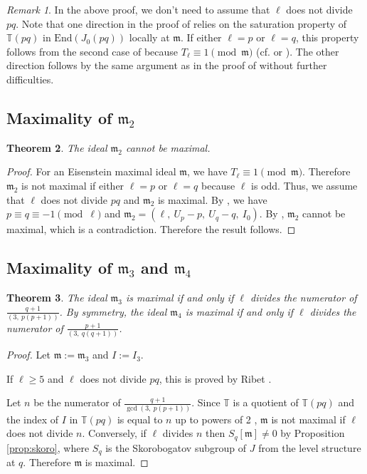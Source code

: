 \documentclass[a4paper, 12pt]{amsart}
\newtheorem{thm}{Theorem}[section]
\theoremstyle{definition}
\theoremstyle{remark}
\newtheorem{rem}[thm]{Remark}
\numberwithin{equation}{section} \numberwithin{table}{section}
\begin{document}
\begin{rem}
In the above proof, we don't need to assume that $\ell$ does not divide $pq$. Note that one direction in the proof of \cite[Theorem 2.4]{Yoo14a} relies on the saturation property of ${{\mathbb{T}}}(pq)$ in ${{\mathrm{End}}}(J_0(pq))$ locally at ${{\mathfrak{m}}}$. If either $\ell=p$ or $\ell=q$, this property follows from the second case of \cite[Theorem 3.3]{Yoo14a} because $T_{\ell} \equiv 1 \pmod {{\mathfrak{m}}}$ (cf. \cite[Lemma 1.1]{R08} or \cite[Remark 3.5]{Yoo14a}). The other direction follows by the same argument as in the proof of \cite[Theorem 2.4]{Yoo14a} without further difficulties.
\end{rem}

\subsection{Maximality of ${{\mathfrak{m}}}_2$}
\begin{thm}\label{thm:m2}
The ideal ${{\mathfrak{m}}}_2$ cannot be maximal.
\end{thm}
\begin{proof}
For an Eisenstein maximal ideal ${{\mathfrak{m}}}$, we have $T_{\ell}\equiv 1 \pmod {{\mathfrak{m}}}$. Therefore ${{\mathfrak{m}}}_2$ is not maximal if either $\ell=p$ or $\ell=q$ because $\ell$ is odd. 
Thus, we assume that $\ell$ does not divide $pq$ and ${{\mathfrak{m}}}_2$ is maximal. By \cite[Theorem 1.2.(3)]{Yoo14a}, we have $p\equiv q \equiv -1 {{ \!\pmod {\ell}}}$ and ${{\mathfrak{m}}}_2=(\ell, ~U_p-p,~U_q-q,~I_0)$. By \cite[Proposition 5.5]{Yoo15a}, ${{\mathfrak{m}}}_2$ cannot be maximal, which is a contradiction. Therefore the result follows.
\end{proof}

\subsection{Maximality of ${{\mathfrak{m}}}_3$ and ${{\mathfrak{m}}}_4$}\label{sec:m3}
\begin{thm}\label{thm:m3}
The ideal ${{\mathfrak{m}}}_3$ is maximal if and only if $\ell$ divides the numerator of $\frac{q+1}{(3, ~p(p+1))}$.
By symmetry, the ideal ${{\mathfrak{m}}}_4$ is maximal if and only if $\ell$ divides the numerator of $\frac{p+1}{(3, ~q(q+1))}$.
\end{thm}
\begin{proof}
Let ${{\mathfrak{m}}}:={{\mathfrak{m}}}_3$ and $I:=I_3$.

If $\ell\geq 5$ and $\ell$ does not divide $pq$, this is proved by Ribet \cite[Theorem 1.4(2)]{Yoo14a}.

Let $n$ be the numerator of $\frac{q+1}{\gcd(3, ~p(p+1))}$. Since ${{\mathbb{T}}}$ is a quotient of ${{\mathbb{T}}}(pq)$ and the index of $I$ in ${{\mathbb{T}}}(pq)$ is equal to $n$ up to powers of 2 \cite[Theorem 3.4]{Yoo14}, ${{\mathfrak{m}}}$ is not maximal if $\ell$ does not divide $n$. Conversely, if $\ell$ divides $n$ then $S_q[{{\mathfrak{m}}}] \neq 0$ by Proposition \ref{prop:skoro}, where $S_q$ is the Skorobogatov subgroup of $J$ from the level structure at $q$. Therefore ${{\mathfrak{m}}}$ is maximal.
\end{proof}
\end{document}
